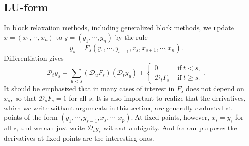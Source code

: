 \documentclass[
  12pt,
]{book}
\begin{document}
\hypertarget{blockrelaxation:rateofconvergence:luform}{%
\subsection{LU-form}\label{blockrelaxation:rateofconvergence:luform}}

In block relaxation methods, including generalized block methods, we update \(x=(x_1,\cdots,x_n)\)
to \(y=(y_1,\cdots,y_n)\)
by the rule
\[
y_s=F_s(y_1,\cdots,y_{s-1},x_s,x_{s+1},\cdots,x_n).
\]
Differentiation gives
\[
\mathcal{D}_ty_s=
\sum_{u<s}(\mathcal{D}_uF_s)(\mathcal{D}_ty_u)+
\begin{cases}0&\text{ if }t<s,\\
\mathcal{D}_tF_s&\text{ if }t\geq s.
\end{cases}.\tag{1}
\]
It should be emphasized that in many cases of interest in \(F_s\) does not depend on \(x_s,\) so that \(\mathcal{D}_sF_s=0\) for all \(s\). It is also important to realize that the derivatives, which we write without arguments in this section, are generally evaluated at points of the form \((y_1,\cdots,y_{s-1},x_s,\cdots,x_p)\). At fixed points, however, \(x_s=y_s\)
for all \(s\), and we can just write \(\mathcal{D}_ty_s\) without ambiguity.
And for our purposes the derivatives at fixed points are the interesting ones.
\end{document}
